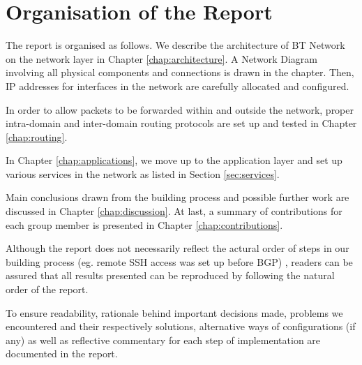 \section{Organisation of the Report}
\label{sec:organisation}

The report is organised as follows. We describe the architecture of BT Network on the network layer in Chapter \ref{chap:architecture}. A Network Diagram involving all physical components and connections is drawn in the chapter. Then, IP addresses for interfaces in the network are carefully allocated and configured. 

In order to allow packets to be forwarded within and outside the network, proper intra-domain and inter-domain routing protocols are set up and tested in Chapter \ref{chap:routing}. 

In Chapter \ref{chap:applications}, we move up to the application layer and set up various services in the network as listed in Section \ref{sec:services}.

Main conclusions drawn from the building process and possible further work are discussed in Chapter \ref{chap:discussion}. At last, a summary of contributions for each group member is presented in Chapter \ref{chap:contributions}.

Although the report does not necessarily reflect the actural order of steps in our building process (eg. remote SSH access was set up before BGP) , readers can be assured that all results presented can be reproduced by following the natural order of the report.

To ensure readability, rationale behind important decisions made, problems we encountered and their respectively solutions, alternative ways of configurations (if any) as well as reflective commentary for each step of implementation are documented in the report.
